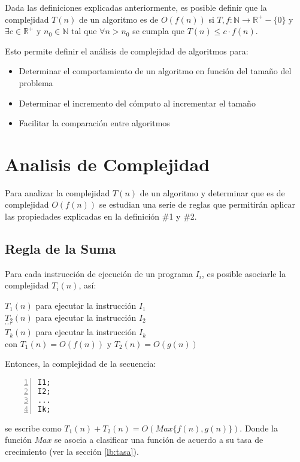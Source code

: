 Dada las definiciones explicadas anteriormente, es posible definir que la complejidad $T(n)$ de un algoritmo es de $O(f(n))$ si $T,f:\mathbb{N} \to \mathbb{R}^+-\{0\}$ y $\exists c \in \mathbb{R}^+$ y $n_0 \in \mathbb{N}$ tal que $\forall n > n_0$ se cumpla que $T(n) \le c \cdot f(n)$.

Esto permite definir el análisis de complejidad de algoritmos para:
\begin{itemize}
\item Determinar el comportamiento de un algoritmo en función del tamaño del problema
\item Determinar el incremento del cómputo al incrementar el tamaño
\item Facilitar la comparación entre algoritmos
\end{itemize}

\section{Analisis de Complejidad} \label{lb:anacompl}

Para analizar la complejidad $T(n)$ de un algoritmo y determinar que es de complejidad $O(f(n))$ se estudian una serie de reglas que permitirán aplicar las propiedades explicadas en la definición \#1 y \#2.

\subsection{Regla de la Suma}

Para cada instrucción de ejecución de un programa $I_i$, es posible asociarle la complejidad $T_i(n)$, así:

$T_1(n)$ para ejecutar la instrucción $I_1$\\
$T_2(n)$ para ejecutar la instrucción $I_2$\\
$\cdots$ \\
$T_k(n)$ para ejecutar la instrucción $I_k$\\

\noindent con $T_1(n) = O(f(n))$ y $T_2(n) = O(g(n))$

Entonces, la complejidad de la secuencia:
\begin{lstlisting}[upquote=true, language=pseudo, numbers=left]
I1;
I2;
...
Ik;
\end{lstlisting}

\noindent se escribe como $T_1(n) + T_2(n) = O(Max\{f(n), g(n)\})$. Donde la función $Max$ se asocia a clasificar una función de acuerdo a su tasa de crecimiento (ver la sección \ref{lb:tasa}).

